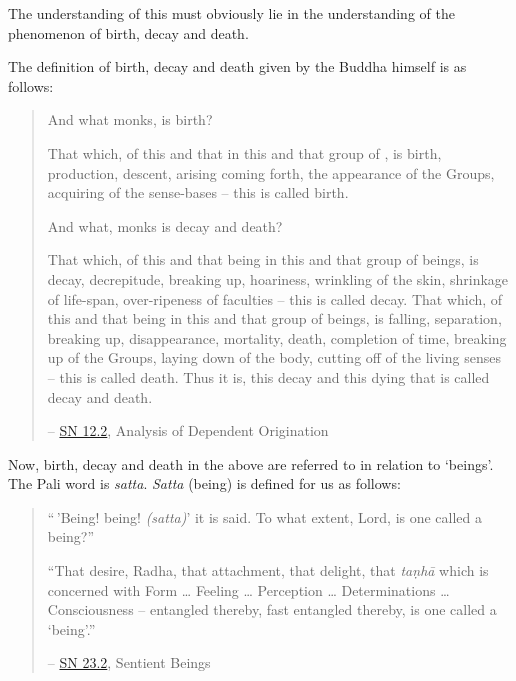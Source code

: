 The understanding of this must obviously lie in the understanding of the phenomenon of birth, decay and death.

The definition of birth, decay and death given by the Buddha himself is as follows:

\begin{quote}
And what monks, is birth?

That which, of this and that  in this and that group of , is birth, production, descent, arising coming forth, the appearance of the Groups, acquiring of the sense-bases -- this is called birth.

And what, monks is decay and death?

That which, of this and that being in this and that group of beings, is decay, decrepitude, breaking up, hoariness, wrinkling of the skin, shrinkage of life-span, over-ripeness of faculties -- this is called decay. That which, of this and that being in this and that group of beings, is falling, separation, breaking up, disappearance, mortality, death, completion of time, breaking up of the Groups, laying down of the body, cutting off of the living senses -- this is called death. Thus it is, this decay and this dying that is called decay and death.

 -- \href{https://suttacentral.net/sn12.2/en/bodhi}{SN 12.2}, Analysis of Dependent Origination
\end{quote}

Now, birth, decay and death in the above are referred to in relation to `beings'. The Pali word is \emph{satta}. \emph{Satta} (being) is defined for us as follows:

\begin{quote}
``\,'Being! being! \emph{(satta)}' it is said. To what extent, Lord, is one called a being?''

``That desire, Radha, that attachment, that delight, that \emph{taṇhā} which is concerned with Form \ldots\hspace{0pt} Feeling \ldots\hspace{0pt} Perception \ldots\hspace{0pt} Determinations \ldots\hspace{0pt} Consciousness -- entangled thereby, fast entangled thereby,  is one called a `being'.''

 -- \href{https://suttacentral.net/sn23.2/en/sujato}{SN 23.2}, Sentient Beings
\end{quote}

